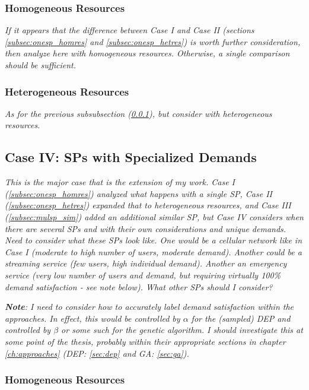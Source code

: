 \documentclass[12pt,dvips]{report}
\begin{document}
\subsubsection{Homogeneous Resources} \label{subsubsec:mulsp_sim_homres}

\textit{If it appears that the difference between Case I and Case II (sections \ref{subsec:onesp_homres} and \ref{subsec:onesp_hetres}) is worth further consideration, then analyze here with homogeneous resources.  Otherwise, a single comparison should be sufficient.}

\subsubsection{Heterogeneous Resources} \label{subsubsec:mulsp_sim_hetres}

\textit{As for the previous subsubsection (\ref{subsubsec:mulsp_sim_homres}), but consider with heterogeneous resources.}

\subsection{Case IV: SPs with Specialized Demands} \label{subsec:mulsp_spec}

\textit{This is the major case that is the extension of my work.  Case I (\ref{subsec:onesp_homres}) analyzed what happens with a single SP, Case II (\ref{subsec:onesp_hetres}) expanded that to heterogeneous resources, and Case III (\ref{subsec:mulsp_sim}) added an additional similar SP, but Case IV considers when there are several SPs and with their own considerations and unique demands.  Need to consider what these SPs look like.  One would be a cellular network like in Case I (moderate to high number of users, moderate demand).  Another could be a streaming service (few users, high individual demand).  Another an emergency service (very low number of users and demand, but requiring virtually 100\% demand satisfaction - see note below).  What other SPs should I consider?}

\textit{\textbf{Note}: I need to consider how to accurately label demand satisfaction within the approaches.  In effect, this would be controlled by $\alpha$ for the (sampled) DEP and controlled by $\beta$ or some such for the genetic algorithm.  I should investigate this at some point of the thesis, probably within their appropriate sections in chapter \ref{ch:approaches} (DEP: \ref{sec:dep} and GA: \ref{sec:ga}).}

\subsubsection{Homogeneous Resources} \label{subsubsec:mulsp_spec_homres}
\end{document}

